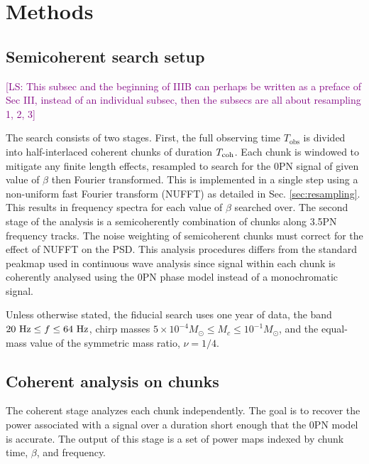 \documentclass[aps,prd,amsmath,floats,floatfix, twocolumn,
superscriptaddress,nofootinbib,showpacs]{revtex4-2}
\newcommand{\ls}[1]{\textcolor{purple}{[LS: #1]}}
\begin{document}
\section{Methods}
\label{sec:methods}

\subsection{Semicoherent search setup}
\label{sec:semicoherent_setup}
\ls{This subsec and the beginning of IIIB can perhaps be written as a preface of Sec III, instead of an individual subsec, then the subsecs are all about resampling 1, 2, 3}

The search consists of two stages.  First, the full observing time $T_\mathrm{obs}$ is divided into half-interlaced coherent chunks of duration $T_{\rm coh}$. Each chunk is windowed to mitigate any finite length effects, resampled to search for the 0PN signal of given value of $\beta$ then Fourier transformed. This is implemented in a single step using a non-uniform fast Fourier transform (NUFFT) as detailed in Sec. \ref{sec:resampling}. This results in frequency spectra for each value of $\beta$ searched over. The second stage of the analysis is a semicoherently combination of chunks along 3.5PN frequency tracks. The noise weighting of semicoherent chunks must correct for the effect of NUFFT on the PSD. This analysis procedures differs from the standard peakmap used in continuous wave analysis since signal within each chunk is coherently analysed using the 0PN phase model instead of a monochromatic signal. 

Unless otherwise stated, the fiducial search uses one year of data, the band
$20~{\rm Hz}\leq f \leq 64~{\rm Hz}$, chirp masses
$5\times10^{-4}M_\odot \leq M_c \leq 10^{-1}M_\odot$, and the equal-mass value
of the symmetric mass ratio, $\nu=1/4$.

\subsection{Coherent analysis on chunks}
\label{sec:parameter_space}
The coherent stage analyzes each chunk independently.  The goal is to recover
the power associated with a signal over a duration short enough that the 0PN
model is accurate.  The output of this stage is a set of power maps indexed by
chunk time, $\beta$, and frequency.
\end{document}
